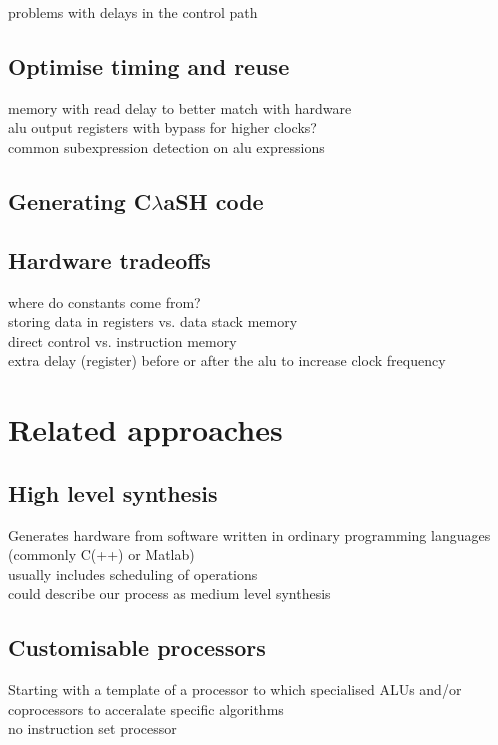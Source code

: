 \documentclass[preprint]{sigplanconf}
\def\clash{C$\lambda$aSH\xspace}
\begin{document}
problems with delays in the control path

\subsection{Optimise timing and reuse}
memory with read delay to better match with hardware \\
alu output registers with bypass for higher clocks? \\
common subexpression detection on alu expressions

\subsection{Generating \clash code}

\subsection{Hardware tradeoffs}
where do constants come from? \\
storing data in registers vs. data stack memory \\
direct control vs. instruction memory \\
extra delay (register) before or after the alu to increase clock frequency

\section{Related approaches}


\subsection{High level synthesis}
Generates hardware from software written in ordinary programming languages (commonly C(++) or Matlab)\\
usually includes scheduling of operations \\
could describe our process as medium level synthesis

\subsection{Customisable processors}
Starting with a template of a processor to which specialised ALUs and/or coprocessors to acceralate specific algorithms \\
no instruction set processor 
\end{document}
